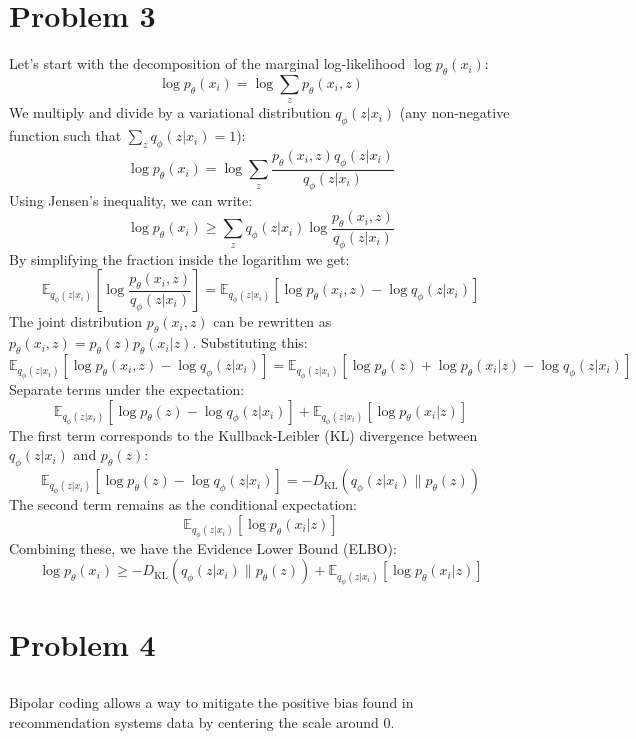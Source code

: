 \documentclass{article}
\begin{document}
\section{Problem 3}
Let's start with the decomposition of the marginal log-likelihood \( \log p_\theta(x_i) \):
$$
\log p_\theta(x_i) = \log \sum_z p_\theta(x_i, z)
$$
We multiply and divide by a variational distribution \( q_\phi(z|x_i) \) (any non-negative function such that \( \sum_z q_\phi(z|x_i) = 1 \)):
$$
\log p_\theta(x_i) = \log \sum_z \frac{p_\theta(x_i, z) q_\phi(z|x_i)}{q_\phi(z|x_i)}
$$
Using Jensen's inequality, we can write:
$$
\log p_\theta(x_i) \geq \sum_z q_\phi(z|x_i) \log \frac{p_\theta(x_i, z)}{q_\phi(z|x_i)}
$$
By simplifying the fraction inside the logarithm we get:
$$
\mathbb{E}_{q_\phi(z|x_i)}\left[\log \frac{p_\theta(x_i, z)}{q_\phi(z|x_i)}\right] = \mathbb{E}_{q_\phi(z|x_i)}\left[\log p_\theta(x_i, z) - \log q_\phi(z|x_i)\right]
$$
The joint distribution \( p_\theta(x_i, z) \) can be rewritten as \( p_\theta(x_i, z) = p_\theta(z)p_\theta(x_i|z) \). Substituting this:
$$
\mathbb{E}_{q_\phi(z|x_i)}\left[\log p_\theta(x_i, z) - \log q_\phi(z|x_i)\right] = \mathbb{E}_{q_\phi(z|x_i)}\left[\log p_\theta(z) + \log p_\theta(x_i|z) - \log q_\phi(z|x_i)\right]
$$
Separate terms under the expectation:
$$
\mathbb{E}_{q_\phi(z|x_i)}\left[\log p_\theta(z) - \log q_\phi(z|x_i)\right] + \mathbb{E}_{q_\phi(z|x_i)}\left[\log p_\theta(x_i|z)\right]
$$
The first term corresponds to the Kullback-Leibler (KL) divergence between \( q_\phi(z|x_i) \) and \( p_\theta(z) \):
$$
\mathbb{E}_{q_\phi(z|x_i)}\left[\log p_\theta(z) - \log q_\phi(z|x_i)\right] = -D_{\text{KL}}(q_\phi(z|x_i) \| p_\theta(z))
$$
The second term remains as the conditional expectation:
$$
\mathbb{E}_{q_\phi(z|x_i)}\left[\log p_\theta(x_i|z)\right]
$$
Combining these, we have the Evidence Lower Bound (ELBO):
$$
\log p_\theta(x_i) \geq -D_{\text{KL}}(q_\phi(z|x_i) \| p_\theta(z)) + \mathbb{E}_{q_\phi(z|x_i)}\left[\log p_\theta(x_i|z)\right]
$$

\section{Problem 4}

\subsection{}
Bipolar coding allows a way to mitigate the positive bias found in recommendation systems data by centering
the scale around 0.
\end{document}
